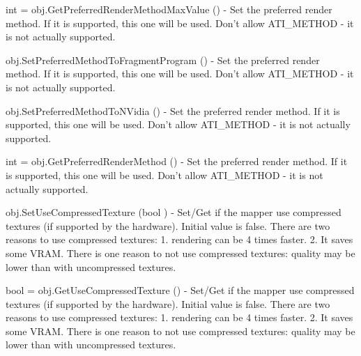 \begin{DoxyItemize}
\item {\ttfamily int = obj.\-Get\-Preferred\-Render\-Method\-Max\-Value ()} -\/ Set the preferred render method. If it is supported, this one will be used. Don't allow A\-T\-I\-\_\-\-M\-E\-T\-H\-O\-D -\/ it is not actually supported.  
\item {\ttfamily obj.\-Set\-Preferred\-Method\-To\-Fragment\-Program ()} -\/ Set the preferred render method. If it is supported, this one will be used. Don't allow A\-T\-I\-\_\-\-M\-E\-T\-H\-O\-D -\/ it is not actually supported.  
\item {\ttfamily obj.\-Set\-Preferred\-Method\-To\-N\-Vidia ()} -\/ Set the preferred render method. If it is supported, this one will be used. Don't allow A\-T\-I\-\_\-\-M\-E\-T\-H\-O\-D -\/ it is not actually supported.  
\item {\ttfamily int = obj.\-Get\-Preferred\-Render\-Method ()} -\/ Set the preferred render method. If it is supported, this one will be used. Don't allow A\-T\-I\-\_\-\-M\-E\-T\-H\-O\-D -\/ it is not actually supported.  
\item {\ttfamily obj.\-Set\-Use\-Compressed\-Texture (bool )} -\/ Set/\-Get if the mapper use compressed textures (if supported by the hardware). Initial value is false. There are two reasons to use compressed textures\-: 1. rendering can be 4 times faster. 2. It saves some V\-R\-A\-M. There is one reason to not use compressed textures\-: quality may be lower than with uncompressed textures.  
\item {\ttfamily bool = obj.\-Get\-Use\-Compressed\-Texture ()} -\/ Set/\-Get if the mapper use compressed textures (if supported by the hardware). Initial value is false. There are two reasons to use compressed textures\-: 1. rendering can be 4 times faster. 2. It saves some V\-R\-A\-M. There is one reason to not use compressed textures\-: quality may be lower than with uncompressed textures.  
\end{DoxyItemize}